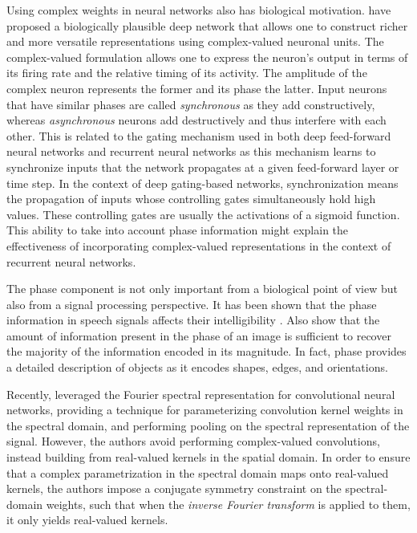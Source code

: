 \documentclass{article}
\begin{document}
Using complex weights in neural networks also has biological motivation. \cite{reichert2013neuronal} have proposed a biologically plausible deep network that allows one to construct richer and more versatile representations using complex-valued neuronal units. The complex-valued formulation allows one to express the neuron’s output in terms of its firing rate and the relative timing of its activity. The amplitude of the complex neuron represents the former and its phase the latter. Input neurons that have similar phases are called \textit{synchronous} as they add constructively, whereas \textit{asynchronous} neurons add destructively and thus interfere with each other. This is related to the gating mechanism used in both deep feed-forward neural networks \citep{srivastava2015training,van2016conditional,van2016wavenet} and recurrent neural networks \citep{hochreiter1997long,cho2014properties,zilly2016recurrent} as this mechanism learns to synchronize inputs that the network propagates at a given feed-forward layer or time step. In the context of deep gating-based networks, synchronization means the propagation of inputs whose controlling gates simultaneously hold high values. These controlling gates are usually the activations of a sigmoid function. This ability to take into account phase information might explain the effectiveness of incorporating complex-valued representations in the context of recurrent neural networks.

The phase component is not only important from a biological point of view but also from a signal processing perspective. It has been shown that the phase information in speech signals affects their intelligibility \citep{shi2006importance}. Also \cite{oppenheim1981importance} show that the amount of information present in the phase of an image is sufficient to recover the majority of the information encoded in its magnitude. In fact, phase provides a detailed description of objects as it encodes shapes, edges, and orientations.

Recently, \cite{rippel2015spectral} leveraged the Fourier spectral representation for convolutional neural networks, providing a technique for parameterizing convolution kernel weights in the spectral domain, and performing pooling on the spectral representation of the signal. However, the authors avoid performing complex-valued convolutions, instead building from real-valued kernels in the spatial domain. In order to ensure that a complex parametrization in the spectral domain maps onto real-valued kernels, the authors impose a conjugate symmetry constraint on the spectral-domain weights, such that when the \emph{inverse Fourier transform} is applied to them, it only yields real-valued kernels.
\end{document}
